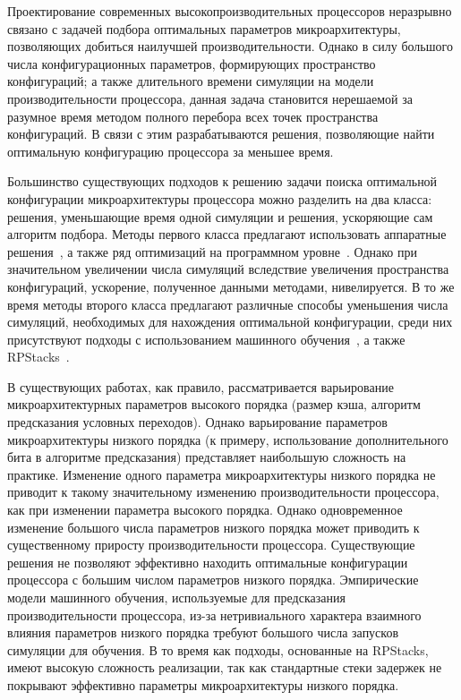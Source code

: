 Проектирование современных высокопроизводительных процессоров неразрывно связано с задачей подбора оптимальных параметров микроархитектуры, позволяющих добиться наилучшей производительности. Однако в силу большого числа конфигурационных параметров, формирующих пространство конфигураций; а также длительного времени симуляции на модели производительности процессора, данная задача становится нерешаемой за разумное время методом полного перебора всех точек пространства конфигураций. В связи с этим разрабатываются решения, позволяющие найти оптимальную конфигурацию процессора за меньшее время.

Большинство существующих подходов к решению задачи поиска оптимальной конфигурации микроархитектуры процессора можно разделить на два класса: решения, уменьшающие время одной симуляции и решения, ускоряющие сам алгоритм подбора. Методы первого класса предлагают использовать аппаратные решения~\cite{chiou2007fpga}, а также ряд оптимизаций на программном уровне~\cite{miller2010graphite}. Однако при значительном увеличении числа симуляций вследствие увеличения пространства конфигураций, ускорение, полученное данными методами, нивелируется. В то же время методы второго класса предлагают различные способы уменьшения числа симуляций, необходимых для нахождения оптимальной конфигурации, среди них присутствуют подходы с использованием машинного обучения~\cite{joseph2006construction,ipek2006efficiently,chen2014archranker}, а также RPStacks~\cite{lee2014rpstacks}.

В существующих работах, как правило, рассматривается варьирование микроархитектурных параметров высокого порядка (размер кэша, алгоритм предсказания условных переходов). Однако варьирование параметров микроархитектуры низкого порядка (к примеру, использование дополнительного бита в алгоритме предсказания) представляет наибольшую сложность на практике. Изменение одного параметра микроархитектуры низкого порядка не приводит к такому значительному изменению производительности процессора, как при изменении параметра высокого порядка. Однако одновременное изменение большого числа параметров низкого порядка может приводить к существенному приросту производительности процессора. Существующие решения не позволяют эффективно находить оптимальные конфигурации процессора с большим числом параметров низкого порядка. Эмпирические модели машинного обучения, используемые для предсказания производительности процессора, из-за нетривиального характера взаимного влияния параметров низкого порядка требуют большого числа запусков симуляции для обучения. В то время как подходы, основанные на RPStacks, имеют высокую сложность реализации, так как стандартные стеки задержек не покрывают эффективно параметры микроархитектуры низкого порядка.

